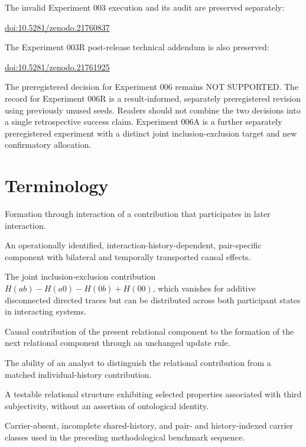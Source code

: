 \documentclass[11pt,a4paper]{article}
\newcommand{\statusnotsupported}{\textsf{NOT SUPPORTED}}
\begin{document}
The invalid Experiment 003 execution and its audit are preserved separately:
\begin{center}
\small\href{https://doi.org/10.5281/zenodo.21760837}{doi:10.5281/zenodo.21760837}
\end{center}
The Experiment 003R post-release technical addendum is also preserved:
\begin{center}
\small\href{https://doi.org/10.5281/zenodo.21761925}{doi:10.5281/zenodo.21761925}
\end{center}

The preregistered decision for Experiment 006 remains \statusnotsupported. The record for Experiment 006R is a result-informed, separately preregistered revision using previously unused seeds. Readers should not combine the two decisions into a single retrospective success claim. Experiment 006A is a further separately preregistered experiment with a distinct joint inclusion-exclusion target and new confirmatory allocation.

\section{Terminology}

\begin{description}[style=nextline,leftmargin=1em,labelindent=0pt]
\item[Relational generation] Formation through interaction of a contribution that participates in later interaction.
\item[Relational carrier] An operationally identified, interaction-history-dependent, pair-specific component with bilateral and temporally transported causal effects.
\item[Nonseparable relational C] The joint inclusion-exclusion contribution $H(ab)-H(a0)-H(0b)+H(00)$, which vanishes for additive disconnected directed traces but can be distributed across both participant states in interacting systems.
\item[Self-re-entry] Causal contribution of the present relational component to the formation of the next relational component through an unchanged update rule.
\item[External identifiability] The ability of an analyst to distinguish the relational contribution from a matched individual-history contribution.
\item[Operational projection of O3] A testable relational structure exhibiting selected properties associated with third subjectivity, without an assertion of ontological identity.
\item[Class~0 / Class~1 / Class~2] Carrier-absent, incomplete shared-history, and pair- and history-indexed carrier classes used in the preceding methodological benchmark sequence.
\end{description}
\end{document}
